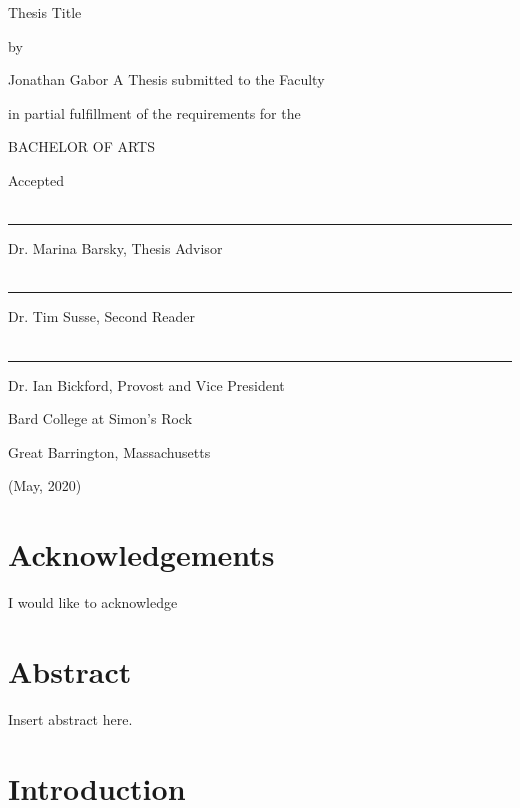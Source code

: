 \documentclass[twoside]{report}
\begin{document}
\thispagestyle{empty}

\begin{center}
    Thesis Title
    
    by
    
    Jonathan Gabor
    \vfill{}
    A Thesis submitted to the Faculty
    
    in partial fulfillment of the requirements for the
    
    BACHELOR OF ARTS
    \vfill
\end{center}

\begin{singlespace}
    Accepted \\ \\
    
    \rule{2in}{0.4pt}
    
    Dr. Marina Barsky, Thesis Advisor \\ \\
    
    \rule{2in}{0.4pt}
    
    Dr. Tim Susse, Second Reader \\ \\
    
    \rule{2in}{0.4pt}
    
    Dr. Ian Bickford, Provost and Vice President
\end{singlespace}

\begin{center}
    Bard College at Simon's Rock

    Great Barrington, Massachusetts
    
    (May, 2020)
\end{center}

\chapter*{Acknowledgements}
I would like to acknowledge

\tableofcontents
\listoffigures
\listoftables

\chapter*{Abstract}
Insert abstract here.

\chapter{Introduction}
\end{document}
